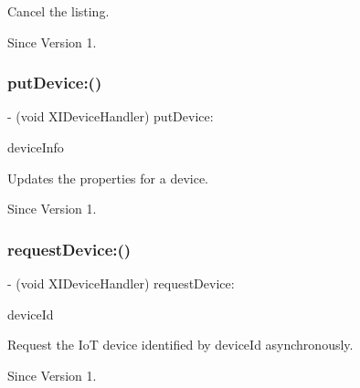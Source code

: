 Cancel the listing. 

\begin{DoxySince}{Since}
Version 1. 
\end{DoxySince}
\hypertarget{protocol_x_i_device_handler_01-p_aef8e4bb0c2696266b8172f8d10743bd0}{}\label{protocol_x_i_device_handler_01-p_aef8e4bb0c2696266b8172f8d10743bd0} 
\subsubsection{\texorpdfstring{put\+Device\+:()}{putDevice:()}}
{\footnotesize\ttfamily -\/ (void X\+I\+Device\+Handler) put\+Device\+: \begin{DoxyParamCaption}\item[{(\hyperlink{class_x_i_device_info}{X\+I\+Device\+Info} $\ast$)}]{device\+Info }\end{DoxyParamCaption}}



Updates the properties for a device. 

\begin{DoxySince}{Since}
Version 1. 
\end{DoxySince}
\hypertarget{protocol_x_i_device_handler_01-p_a03714ca27ff2c98b10bfec118c4a0ee7}{}\label{protocol_x_i_device_handler_01-p_a03714ca27ff2c98b10bfec118c4a0ee7} 
\subsubsection{\texorpdfstring{request\+Device\+:()}{requestDevice:()}}
{\footnotesize\ttfamily -\/ (void X\+I\+Device\+Handler) request\+Device\+: \begin{DoxyParamCaption}\item[{(N\+S\+String $\ast$)}]{device\+Id }\end{DoxyParamCaption}}



Request the IoT device identified by device\+Id asynchronously. 

\begin{DoxySince}{Since}
Version 1. 
\end{DoxySince}


